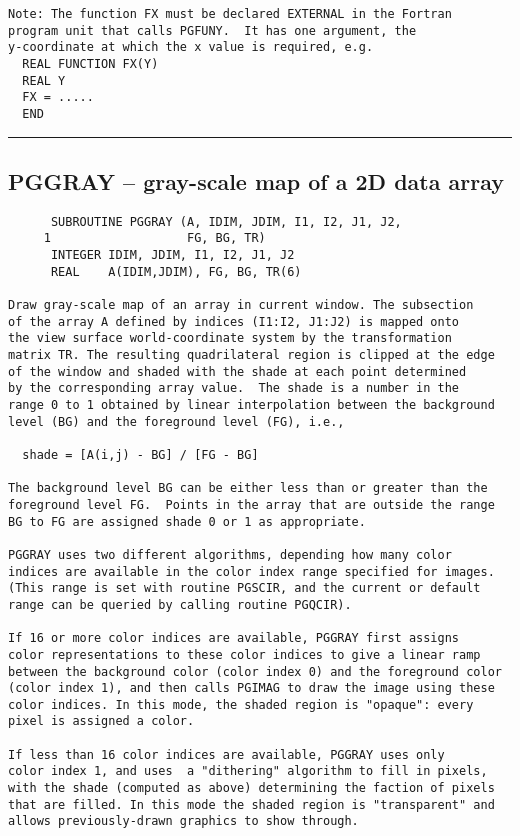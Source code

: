 {\begin{verbatim}
Note: The function FX must be declared EXTERNAL in the Fortran
program unit that calls PGFUNY.  It has one argument, the
y-coordinate at which the x value is required, e.g.
  REAL FUNCTION FX(Y)
  REAL Y
  FX = .....
  END
\end{verbatim}
\hrule


\subsection*{PGGRAY -- gray-scale map of a 2D data array }
\begin{verbatim}
      SUBROUTINE PGGRAY (A, IDIM, JDIM, I1, I2, J1, J2,
     1                   FG, BG, TR)
      INTEGER IDIM, JDIM, I1, I2, J1, J2
      REAL    A(IDIM,JDIM), FG, BG, TR(6)

Draw gray-scale map of an array in current window. The subsection
of the array A defined by indices (I1:I2, J1:J2) is mapped onto
the view surface world-coordinate system by the transformation
matrix TR. The resulting quadrilateral region is clipped at the edge
of the window and shaded with the shade at each point determined
by the corresponding array value.  The shade is a number in the
range 0 to 1 obtained by linear interpolation between the background
level (BG) and the foreground level (FG), i.e.,

  shade = [A(i,j) - BG] / [FG - BG]

The background level BG can be either less than or greater than the
foreground level FG.  Points in the array that are outside the range
BG to FG are assigned shade 0 or 1 as appropriate.

PGGRAY uses two different algorithms, depending how many color
indices are available in the color index range specified for images.
(This range is set with routine PGSCIR, and the current or default
range can be queried by calling routine PGQCIR).

If 16 or more color indices are available, PGGRAY first assigns
color representations to these color indices to give a linear ramp
between the background color (color index 0) and the foreground color
(color index 1), and then calls PGIMAG to draw the image using these
color indices. In this mode, the shaded region is "opaque": every
pixel is assigned a color.

If less than 16 color indices are available, PGGRAY uses only
color index 1, and uses  a "dithering" algorithm to fill in pixels,
with the shade (computed as above) determining the faction of pixels
that are filled. In this mode the shaded region is "transparent" and
allows previously-drawn graphics to show through.


\end{verbatim}}
